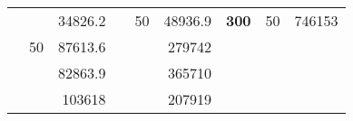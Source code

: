 \begin{table}[]
\begin{tabular}{|ccrccrccc}
\rowcolor[HTML]{DDFDFF} 
\multicolumn{1}{|c|}{\cellcolor[HTML]{FFFFC7}}                                & \multicolumn{1}{c|}{\cellcolor[HTML]{DDFDFF}}                      & \multicolumn{1}{r|}{\cellcolor[HTML]{DAE8FC}34826.2}   & \multicolumn{1}{c|}{\cellcolor[HTML]{FFFFC7}}                                & \multicolumn{1}{c|}{\multirow{-10}{*}{\cellcolor[HTML]{DDFDFF}50}}  & \multicolumn{1}{r|}{\cellcolor[HTML]{DDFDFF}48936.9}   & \multicolumn{1}{c|}{\multirow{-19}{*}{\cellcolor[HTML]{FFFFC7}\textbf{300}}} & \multicolumn{1}{c|}{\multirow{-10}{*}{\cellcolor[HTML]{DDFDFF}50}} & \multicolumn{1}{r|}{\cellcolor[HTML]{DDFDFF}746153}    \\ \cline{3-3} \cline{5-9} 
\multicolumn{1}{|c|}{\cellcolor[HTML]{FFFFC7}}                                & \multicolumn{1}{c|}{\multirow{-10}{*}{\cellcolor[HTML]{DDFDFF}50}} & \multicolumn{1}{r|}{\cellcolor[HTML]{DDFDFF}87613.6}   & \multicolumn{1}{c|}{\cellcolor[HTML]{FFFFC7}}                                & \multicolumn{1}{c|}{\cellcolor[HTML]{DAE8FC}}                       & \multicolumn{1}{r|}{\cellcolor[HTML]{DAE8FC}279742}    &                                                                              &                                                                    &                                                        \\ \cline{2-3} \cline{6-6}
\multicolumn{1}{|c|}{\cellcolor[HTML]{FFFFC7}}                                & \multicolumn{1}{c|}{\cellcolor[HTML]{DAE8FC}}                      & \multicolumn{1}{r|}{\cellcolor[HTML]{DAE8FC}82863.9}   & \multicolumn{1}{c|}{\cellcolor[HTML]{FFFFC7}}                                & \multicolumn{1}{c|}{\cellcolor[HTML]{DAE8FC}}                       & \multicolumn{1}{r|}{\cellcolor[HTML]{DDFDFF}365710}    &                                                                              &                                                                    &                                                        \\ \cline{3-3} \cline{6-6}
\multicolumn{1}{|c|}{\cellcolor[HTML]{FFFFC7}}                                & \multicolumn{1}{c|}{\cellcolor[HTML]{DAE8FC}}                      & \multicolumn{1}{r|}{\cellcolor[HTML]{DDFDFF}103618}    & \multicolumn{1}{c|}{\cellcolor[HTML]{FFFFC7}}                                & \multicolumn{1}{c|}{\cellcolor[HTML]{DAE8FC}}                       & \multicolumn{1}{r|}{\cellcolor[HTML]{DAE8FC}207919}    &                                                                              &                                                                    &                                                        \\ \cline{3-3} \cline{6-6}

\end{tabular}
\end{table}
